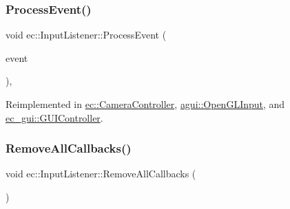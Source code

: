 \mbox{\label{classec_1_1_input_listener_a25ef07efb72ac5c880cbca876ddfe66a}} 
\subsubsection{\texorpdfstring{Process\+Event()}{ProcessEvent()}}
{\footnotesize\ttfamily void ec\+::\+Input\+Listener\+::\+Process\+Event (\begin{DoxyParamCaption}\item[{const \mbox{\hyperlink{structec_1_1_input_event}{Input\+Event}} \&}]{event }\end{DoxyParamCaption})\hspace{0.3cm}{\ttfamily [protected]}, {\ttfamily [virtual]}}



Reimplemented in \mbox{\hyperlink{classec_1_1_camera_controller_a0e2d455602581a484daf81bdb60a01bc}{ec\+::\+Camera\+Controller}}, \mbox{\hyperlink{classagui_1_1_open_g_l_input_afee8d588768cea3b75bcb3de36e03397}{agui\+::\+Open\+G\+L\+Input}}, and \mbox{\hyperlink{classec__gui_1_1_g_u_i_controller_a3d9e413ddf78d41e929ec652c5409f3c}{ec\+\_\+gui\+::\+G\+U\+I\+Controller}}.

\mbox{\label{classec_1_1_input_listener_af7dd3e51508a10667973c36ef7ef48a8}} 
\subsubsection{\texorpdfstring{Remove\+All\+Callbacks()}{RemoveAllCallbacks()}}
{\footnotesize\ttfamily void ec\+::\+Input\+Listener\+::\+Remove\+All\+Callbacks (\begin{DoxyParamCaption}{ }\end{DoxyParamCaption})}

\mbox{\label{classec_1_1_input_listener_a8903c97def61ce6b9b15f36b26998883}} 
